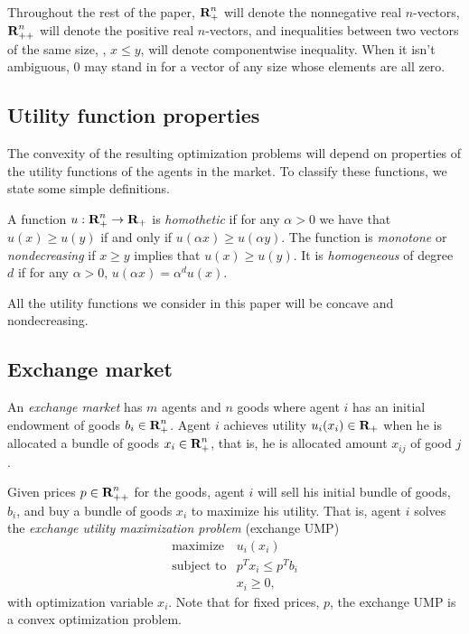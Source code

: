\documentclass[12pt]{article}
\begin{document}
Throughout the rest of the paper, ${\mbox{\bf R}}^n_+$ will denote the nonnegative
real $n$-vectors, ${\mbox{\bf R}}^n_{++}$ will denote the positive real $n$-vectors,
and inequalities between two vectors of the same size, \eg, $x \leq y$,
will denote componentwise inequality. When it isn't ambiguous, $0$ may stand
in for a vector of any size whose elements are all zero.

\subsection{Utility function properties}

The convexity of the resulting optimization problems will depend on properties
of the utility functions of the agents in the market. To classify these
functions, we state some simple definitions.

A function $u: {\mbox{\bf R}}^n_+ \to {\mbox{\bf R}}_+$ is \emph{homothetic} if for any $\alpha
> 0$ we have that $u(x) \geq u(y)$ if and only if $u(\alpha x) \geq u(\alpha
y)$. The function is \emph{monotone} or \emph{nondecreasing} if $x \geq y$
implies that $u(x) \geq u(y)$. It is \emph{homogeneous} of degree $d$ if for
any $\alpha > 0$, $u(\alpha x) = \alpha^d u(x)$.

All the utility functions we consider in this paper will be concave and
nondecreasing.

\subsection{Exchange market}
\label{sec:exchange_def}

An \emph{exchange market} has $m$ agents and $n$ goods where agent $i$ has an
initial endowment of goods $b_i \in {\mbox{\bf R}}_+^n$. Agent $i$ achieves utility
$u_i(x_i) \in {\mbox{\bf R}}_+$ when he is allocated a bundle of goods $x_i \in
{\mbox{\bf R}}^n_{+}$, that is, he is allocated amount $x_{ij}$ of good $j$.

Given prices $p \in {\mbox{\bf R}}^n_{++}$ for the goods, agent $i$ will sell his
initial bundle of goods, $b_i$, and buy a bundle of goods $x_i$ to maximize his
utility. That is, agent $i$ solves the \emph{exchange utility maximization
problem} (exchange UMP)
\begin{equation}
\label{p-ump}
\begin{array}{ll}
\mbox{maximize} & u_i(x_i) \\
\mbox{subject to} & p^T x_i \leq p^T b_i \\
& x_i \geq 0,
\end{array}
\end{equation}
with optimization variable $x_i$. Note that for fixed prices, $p$, the exchange
UMP is a convex optimization problem.
\end{document}
